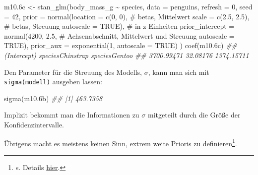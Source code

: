 \documentclass[
  a4paper,
  DIV=11]{scrreprt}
\newenvironment{Shaded}{\begin{snugshade}}{\end{snugshade}}
\newcommand{\AttributeTok}[1]{\textcolor[rgb]{0.40,0.45,0.13}{#1}}
\newcommand{\CommentTok}[1]{\textcolor[rgb]{0.37,0.37,0.37}{#1}}
\newcommand{\ConstantTok}[1]{\textcolor[rgb]{0.56,0.35,0.01}{#1}}
\newcommand{\DecValTok}[1]{\textcolor[rgb]{0.68,0.00,0.00}{#1}}
\newcommand{\DocumentationTok}[1]{\textcolor[rgb]{0.37,0.37,0.37}{\textit{#1}}}
\newcommand{\FloatTok}[1]{\textcolor[rgb]{0.68,0.00,0.00}{#1}}
\newcommand{\FunctionTok}[1]{\textcolor[rgb]{0.28,0.35,0.67}{#1}}
\newcommand{\NormalTok}[1]{\textcolor[rgb]{0.00,0.23,0.31}{#1}}
\newcommand{\OtherTok}[1]{\textcolor[rgb]{0.00,0.23,0.31}{#1}}
\newcommand{\SpecialCharTok}[1]{\textcolor[rgb]{0.37,0.37,0.37}{#1}}
\theoremstyle{definition}
\theoremstyle{remark}
\begin{document}
\begin{Shaded}
\begin{Highlighting}[]
\NormalTok{m10}\FloatTok{.6}\NormalTok{c }\OtherTok{\textless{}{-}} \FunctionTok{stan\_glm}\NormalTok{(body\_mass\_g }\SpecialCharTok{\textasciitilde{}}\NormalTok{ species, }
                   \AttributeTok{data =}\NormalTok{ penguins, }
                   \AttributeTok{refresh =} \DecValTok{0}\NormalTok{,}
                   \AttributeTok{seed =} \DecValTok{42}\NormalTok{,}
                   \AttributeTok{prior =} \FunctionTok{normal}\NormalTok{(}\AttributeTok{location =} \FunctionTok{c}\NormalTok{(}\DecValTok{0}\NormalTok{, }\DecValTok{0}\NormalTok{),  }\CommentTok{\# betas, Mittelwert}
                                  \AttributeTok{scale =} \FunctionTok{c}\NormalTok{(}\FloatTok{2.5}\NormalTok{, }\FloatTok{2.5}\NormalTok{),  }\CommentTok{\# betas, Streuung}
                                  \AttributeTok{autoscale =} \ConstantTok{TRUE}\NormalTok{),  }\CommentTok{\# in z{-}Einheiten}
                   \AttributeTok{prior\_intercept =} \FunctionTok{normal}\NormalTok{(}\DecValTok{4200}\NormalTok{, }\FloatTok{2.5}\NormalTok{,   }\CommentTok{\# Achsenabschnitt, Mittelwert und Streuung}
                                            \AttributeTok{autoscale =} \ConstantTok{TRUE}\NormalTok{), }
                   \AttributeTok{prior\_aux =} \FunctionTok{exponential}\NormalTok{(}\DecValTok{1}\NormalTok{, }\AttributeTok{autoscale =} \ConstantTok{TRUE}\NormalTok{)}
\NormalTok{)}
\FunctionTok{coef}\NormalTok{(m10}\FloatTok{.6}\NormalTok{c)}
\DocumentationTok{\#\#      (Intercept) speciesChinstrap    speciesGentoo }
\DocumentationTok{\#\#       3700.99471         32.08176       1374.15711}
\end{Highlighting}
\end{Shaded}

Den Parameter für die Streuung des Modells, \(\sigma\), kann man sich
mit \texttt{sigma(modell)} ausgeben lassen:

\begin{Shaded}
\begin{Highlighting}[]
\FunctionTok{sigma}\NormalTok{(m10}\FloatTok{.6}\NormalTok{b)}
\DocumentationTok{\#\# [1] 463.7358}
\end{Highlighting}
\end{Shaded}

Implizit bekommt man die Informationen zu \(\sigma\) mitgeteilt durch
die Größe der Konfidenzintervalle.

Übrigens macht es meistens keinen Sinn, extrem weite Prioris zu
definieren\footnote{s. Details
  \href{https://mc-stan.org/rstanarm/articles/priors.html\#how-to-specify-flat-priors-and-why-you-typically-shouldnt}{hier}.}.
\end{document}
